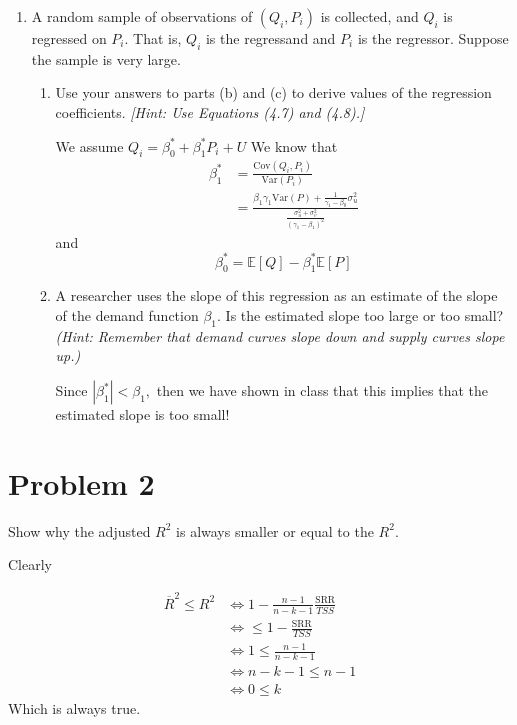 \documentclass[11pt]{article}
\newcommand{\Var}{\text{Var}}
\newcommand{\Cov}{\text{Cov}}
\newcommand{\bbE}{\mathbb{E}}
\begin{document}
\begin{enumerate}
    \item A random sample of observations of \( (Q_i, P_i) \) is collected, and \( Q_i \) is regressed on \( P_i \). That is, \( Q_i \) is the regressand and \( P_i \) is the regressor. Suppose the sample is very large.
    \begin{enumerate}
        \item Use your answers to parts (b) and (c) to derive values of the regression coefficients. \textit{[Hint: Use Equations (4.7) and (4.8).]}
        \begin{solution}
        We assume $Q_i = \beta_0^* + \beta_1^* P_i + U$ We know that 
            \begin{align*}
                \beta_1^*&= \frac{\Cov(Q_i, P_i)}{\Var(P_i)}\\
                &= \frac{\beta_1 \gamma_1\Var(P) + \frac{1}{\gamma_1 - \beta_0} \sigma_u^2}{\frac{\sigma_u^2 + \sigma_v^2}{(\gamma_1 - \beta_1)^2}}
            \end{align*}
            and 
            \[\beta_0^* = \bbE[Q] - \beta_1^* \bbE[P]\]
        \end{solution}
        
        \item A researcher uses the slope of this regression as an estimate of the slope of the demand function \( \beta_1 \). Is the estimated slope too large or too small? \textit{(Hint: Remember that demand curves slope down and supply curves slope up.)}
        \begin{solution}
            Since $|\beta_1^*|< \beta_1,$ then we have shown in class that this implies that the estimated slope is too small!
        \end{solution}
    \end{enumerate}
\end{enumerate}




\vspace{2.5in}
\newpage

\section*{Problem 2}

Show why the adjusted \( R^2 \) is always smaller or equal to the \( R^2 \).

\begin{solution}
Clearly

\begin{align*}
    \overline{R}^2 \leq R^2 &\iff 1 - \frac{n-1}{n-k-1}\frac{\text{SRR}}{TSS}\\ &\iff \leq 1 - \frac{\text{SRR}}{TSS}\\ &\iff
    1 \leq \frac{n-1}{n-k-1} \\
    &\iff n-k-1 \leq n-1 \\
    &\iff 0\leq k
\end{align*}
Which is always true.
\end{solution}
\end{document}
